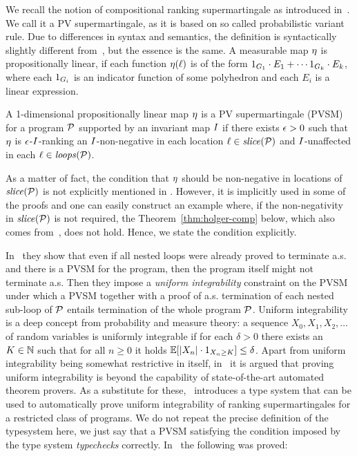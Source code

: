 We recall the notion of compositional ranking supermartingale as introduced 
in~\cite{HolgerPOPL}. We call it a PV supermartingale, as it is based on so 
called probabilistic variant rule. Due to differences in syntax and semantics, 
the definition is syntactically slightly different from~\cite{HolgerPOPL}, but 
the essence is the same. A measurable map $\eta$ is propositionally linear, if 
each function $\eta(\ell)$ is of the form ${1}_{G_1}\cdot E_1 + \cdots 
{1}_{G_k}\cdot E_k$, where each ${1}_{G_i}$ is an indicator 
function of some polyhedron and each $E_i$ is a linear expression.

\begin{definition}
A 1-dimensional propositionally linear map $\eta$ is a PV supermartingale (PVSM) for a program $\mathcal{P}$ supported by an invariant map $I$ if there exists $\epsilon>0$ such that $\eta$ is $\epsilon$-$I$-ranking an $I$-non-negative in each location $\ell\in\mathit{slice}{(\mathcal{P})}$ and $I$-unaffected in each $\ell\in\mathit{loops}(\mathcal{P})$.
\end{definition}

As a matter of fact, the condition that $\eta$ should be non-negative in locations of $\mathit{slice}{(\mathcal{P})}$ is not explicitly mentioned in \cite{HolgerPOPL}. However, it is implicitly used in some of the proofs and one can easily construct an example where, if the non-negativity in $\mathit{slice}{(\mathcal{P})}$ is not required, the Theorem~\ref{thm:holger-comp} below, which also comes from~\cite{HolgerPOPL}, does not hold. Hence, we state the condition explicitly.

In~\cite{HolgerPOPL} they show that even if all nested loops were already 
proved to terminate a.s. and there is a PVSM for the program, then the program 
itself might not terminate a.s. Then they impose a \emph{uniform integrability} 
constraint on the PVSM under which a 
PVSM together with a proof of a.s. termination of each nested sub-loop of 
$\mathcal{P}$ entails termination of the whole program $\mathcal{P}$. 
Uniform integrability is a deep 
concept from probability and measure theory: a sequence $X_0,X_1,X_2,\dots$ of 
random variables is uniformly integrable if for each $\delta>0$ there exists an 
$K\in \mathbb{N}$ such that for all $n\geq 0$ it holds $\mathbb{E}[|X_n|\cdot{1}_{X_n 
	\geq K}]\leq \delta$.
Apart from uniform 
integrability being somewhat restrictive in itself, in~\cite{HolgerPOPL} it is 
argued that proving uniform integrability is beyond the capability of 
state-of-the-art automated theorem provers. As a substitute for 
these,~\cite{HolgerPOPL} introduces a type system that can be used to 
automatically prove 
uniform integrability of ranking supermartingales for a restricted class of 
programs.
We do not repeat the precise definition of the typesystem here, we just say 
that a PVSM satisfying the condition imposed by the type system 
\emph{typechecks} correctly. 
In~\cite{HolgerPOPL} the following was proved:

